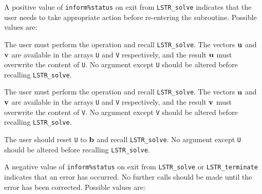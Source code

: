 \documentclass{galahad}
\newcommand{\packagename}{LS\-TR}
\begin{document}
\galreverse
A positive value of {\tt inform\%status} on exit from  
{\tt \packagename\_solve} indicates that the user needs to take appropriate 
action before re-entering the subroutine. Possible values are: 
 
\begin{description} 
 
 The user must perform the operation  
\disp{\bmu := \bmu + \bmA \bmv,}
and recall {\tt \packagename\_solve}. 
The vectors ${\mathbf{u}}$ and ${\mathbf{v}}$ are available in the arrays {\tt U}
and {\tt V} respectively, and the result  
${\mathbf{u}}$ must overwrite the content of {\tt U}. 
No argument except {\tt U} should be altered before recalling 
{\tt \packagename\_solve}. 
 
 The user must perform the operation  
and recall {\tt \packagename\_solve}. 
The vectors ${\mathbf{u}}$ and ${\mathbf{v}}$ are available in the arrays {\tt U}
and {\tt V} respectively, and the result  
${\mathbf{v}}$ must overwrite the content of {\tt V}. 
No argument except {\tt V} should be altered before recalling 
{\tt \packagename\_solve}. 
 
  The user should reset {\tt U} to ${\mathbf{b}}$ and recall 
{\tt \packagename\_solve}. 
No argument except {\tt U} should be altered before recalling 
{\tt \packagename\_solve}. 

\end{description} 


\galerrors
A negative value of  {\tt inform\%status} on exit from 
{\tt \packagename\_solve}
or 
{\tt \packagename\_terminate}
indicates that an error has occurred. No further calls should be made
until the error has been corrected. Possible values are:
\end{document}
